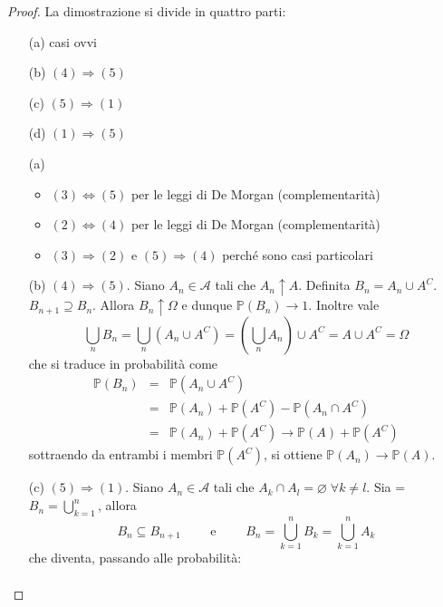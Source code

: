 \documentclass[a4paper,12pt]{article}
\theoremstyle{break}
\let\emptyset\varnothing
\numberwithin{equation}{section}
\begin{document}
\begin{proof}
  La dimostrazione si divide in quattro parti:
  \begin{itemize}
    \item[(a)] casi ovvi
    \item[(b)] \((4) \Longrightarrow (5)\)
    \item[(c)] \((5) \Longrightarrow (1)\)
    \item[(d)] \((1) \Longrightarrow (5)\)   
  \end{itemize}
  \begin{itemize}
    \item[(a)] \begin{itemize}
      \item \((3) \Longleftrightarrow (5)\) per le leggi di De Morgan (complementarità)
      \item \((2) \Longleftrightarrow (4)\) per le leggi di De Morgan (complementarità)
      \item \((3) \Longrightarrow (2)\) e \((5) \Longrightarrow (4)\) perché sono casi particolari
    \end{itemize}
    \item[(b)] \((4) \Longrightarrow (5)\). Siano \(A_n \in \mathcal{A}\) tali che \(A_n \uparrow A\). Definita \(B_n = A_n \cup A^C\). \(B_{n+1} \supseteq B_n\). Allora \(B_n \uparrow \Omega\) e dunque \(\mathbb{P}(B_n) \rightarrow 1\). Inoltre vale 
    \[
      \bigcup_n B_n = \bigcup_n (A_n \cup A^C) = \left(\bigcup_n A_n\right) \cup A^C = A \cup A^C = \Omega
    \] 
    che si traduce in probabilità come 
    \[
      \begin{array}{lll}
        \mathbb{P}(B_n) & = & \mathbb{P}(A_n \cup A^C) \\
        & = & \mathbb{P}(A_n) + \mathbb{P}(A^C) - \mathbb{P}(A_n \cap A^C) \\
        & = & \mathbb{P}(A_n) + \mathbb{P}(A^C) \rightarrow \mathbb{P}(A) + \mathbb{P}(A^C)
      \end{array}
    \]
    sottraendo da entrambi i membri \(\mathbb{P}(A^C)\), si ottiene \(\mathbb{P}(A_n) \to \mathbb{P}(A)\). 
    \item[(c)] \((5) \Longrightarrow (1)\). Siano \(A_n \in \mathcal{A}\) tali che \(A_k \cap A_l = \emptyset \; \forall k \not = l\). Sia {\everymath = {\displaystyle}\(B_n = \bigcup _{k=1}^n\)}, allora 
    \[
      B_n \subseteq B_{n+1} \qquad \mbox{ e } \qquad B_n = \bigcup_{k=1}^n B_k = \bigcup_{k = 1}^n A_k
    \] 
    che diventa, passando alle probabilità:
    \[
      \begin{array}{lll}

\end{array}\]
\end{itemize}
\end{proof}
\end{document}
